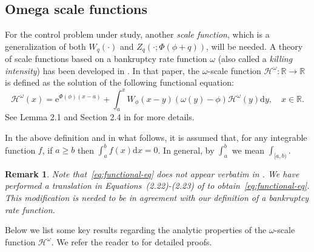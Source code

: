 \documentclass[10pt,a4paper]{amsart}
\newtheorem{remark}{Remark}[section]
\newcommand{\reals}{\mathbb{R}}
\newcommand{\diff}{\mathrm{d}}
\newcommand{\cH}{\mathcal{H}}
\renewcommand{\geq}{\geqslant}
\begin{document}
\subsection{Omega scale functions}\label{Sec:Solution:Complete}

For the control problem under study, another \textit{scale function}, which is a generalization of both $W_{q}(\cdot)$ and $Z_q (\cdot;\Phi(\phi+q))$, will be needed. A theory of scale functions based on a bankruptcy rate function $\omega$ (also called a \textit{killing intensity}) has been developed in \cite{li-palmowski_2018}. In that paper, the $\omega$-scale function $\cH^{\omega} \colon \reals \to \reals$ is defined as the solution of the following functional equation:
\begin{equation}\label{eq:functional-eq}
	\cH^{\omega}(x) = \mathrm e^{\Phi(\phi)(x-a)} + \int_{a}^x W_{\phi}(x-y) (\omega(y) - \phi) \cH^{\omega}(y) \diff y , \quad x \in \reals .
\end{equation}
See Lemma 2.1 and Section 2.4 in \cite{li-palmowski_2018} for more details.

In the above definition and in what follows, it is assumed that, for any integrable function $f$, if $a \geq b$ then $\int_a^b f(x) \diff x = 0$. In general, by $\int_a^b$ we mean $\int_{[a,b)}$.

\begin{remark}
	Note that~\eqref{eq:functional-eq} does not appear verbatim in \cite{li-palmowski_2018}. We have performed a translation in Equations~(2.22)-(2.23) of \cite{li-palmowski_2018} to obtain~\eqref{eq:functional-eq}. This modification is needed to be in agreement with our definition of a bankruptcy rate function.%
\end{remark}

Below we list some key results regarding the analytic properties of the $\omega$-scale function $\cH^{\omega}$. We refer the reader to \cite{mata-renaud_2024} for detailed proofs.
\end{document}
